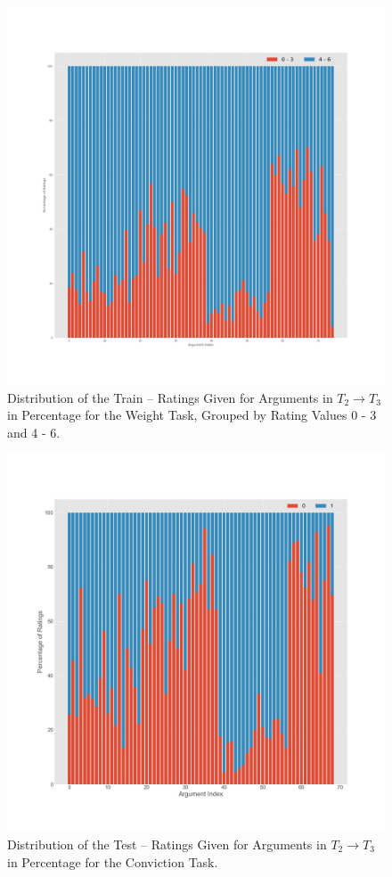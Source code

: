 \begin{figure}[!ht]
    \centering
    \includegraphics[width=1\textwidth]{images/T2_T3_train_Weight.jpg}
    \caption{Distribution of the Train – Ratings Given for Arguments in $T_2 \to T_3$ in Percentage for the Weight Task, Grouped by Rating Values 0 - 3 and 4 - 6.}
    \label{fig:conviction_t1_t2_train}
\end{figure}

\begin{figure}[!ht]
    \centering
    \includegraphics[width=1\textwidth]{images/T2_T3_test_Conviction.jpg}
    \caption{Distribution of the Test – Ratings Given for Arguments in $T_2 \to T_3$ in Percentage for the Conviction Task.}
    \label{fig:conviction_t2_t3_test}
\end{figure}

